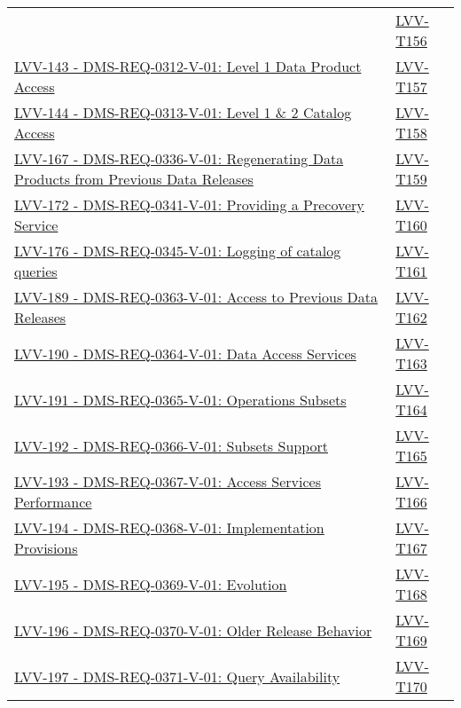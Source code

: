 {\begin{longtable}[]{p{13cm}p{3cm}}
& {
\hyperref[lvv-t156]{LVV-T156}
} \\
\href{https://jira.lsstcorp.org/browse/LVV-143}{LVV-143 - DMS-REQ-0312-V-01: Level 1 Data Product Access}
& {
\hyperref[lvv-t157]{LVV-T157}
} \\
\href{https://jira.lsstcorp.org/browse/LVV-144}{LVV-144 - DMS-REQ-0313-V-01: Level 1 \& 2 Catalog Access}
& {
\hyperref[lvv-t158]{LVV-T158}
} \\
\href{https://jira.lsstcorp.org/browse/LVV-167}{LVV-167 - DMS-REQ-0336-V-01: Regenerating Data Products from Previous Data Releases}
& {
\hyperref[lvv-t159]{LVV-T159}
} \\
\href{https://jira.lsstcorp.org/browse/LVV-172}{LVV-172 - DMS-REQ-0341-V-01: Providing a Precovery Service}
& {
\hyperref[lvv-t160]{LVV-T160}
} \\
\href{https://jira.lsstcorp.org/browse/LVV-176}{LVV-176 - DMS-REQ-0345-V-01: Logging of catalog queries}
& {
\hyperref[lvv-t161]{LVV-T161}
} \\
\href{https://jira.lsstcorp.org/browse/LVV-189}{LVV-189 - DMS-REQ-0363-V-01: Access to Previous Data Releases}
& {
\hyperref[lvv-t162]{LVV-T162}
} \\
\href{https://jira.lsstcorp.org/browse/LVV-190}{LVV-190 - DMS-REQ-0364-V-01: Data Access Services}
& {
\hyperref[lvv-t163]{LVV-T163}
} \\
\href{https://jira.lsstcorp.org/browse/LVV-191}{LVV-191 - DMS-REQ-0365-V-01: Operations Subsets}
& {
\hyperref[lvv-t164]{LVV-T164}
} \\
\href{https://jira.lsstcorp.org/browse/LVV-192}{LVV-192 - DMS-REQ-0366-V-01: Subsets Support}
& {
\hyperref[lvv-t165]{LVV-T165}
} \\
\href{https://jira.lsstcorp.org/browse/LVV-193}{LVV-193 - DMS-REQ-0367-V-01: Access Services Performance}
& {
\hyperref[lvv-t166]{LVV-T166}
} \\
\href{https://jira.lsstcorp.org/browse/LVV-194}{LVV-194 - DMS-REQ-0368-V-01: Implementation Provisions}
& {
\hyperref[lvv-t167]{LVV-T167}
} \\
\href{https://jira.lsstcorp.org/browse/LVV-195}{LVV-195 - DMS-REQ-0369-V-01: Evolution}
& {
\hyperref[lvv-t168]{LVV-T168}
} \\
\href{https://jira.lsstcorp.org/browse/LVV-196}{LVV-196 - DMS-REQ-0370-V-01: Older Release Behavior}
& {
\hyperref[lvv-t169]{LVV-T169}
} \\
\href{https://jira.lsstcorp.org/browse/LVV-197}{LVV-197 - DMS-REQ-0371-V-01: Query Availability}
& {
\hyperref[lvv-t170]{LVV-T170}
} \\

\end{longtable}}
